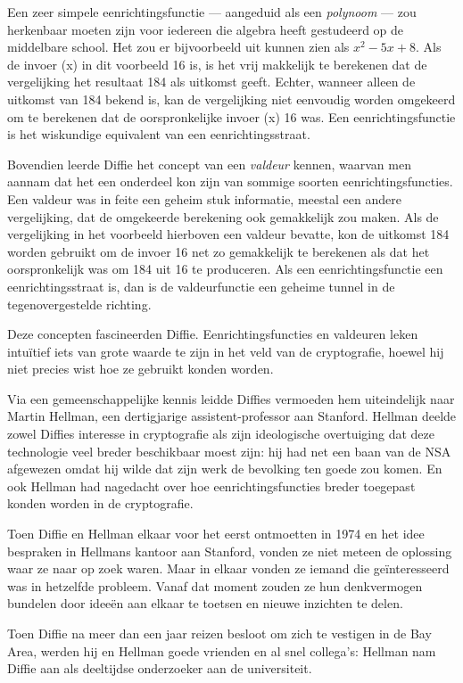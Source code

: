 \documentclass[
  a5paper,
  smalldemyvopaper,11pt,twoside,onecolumn,openright,extrafontsizes,
hidelinks]{memoir}
\begin{document}
Een zeer simpele eenrichtingsfunctie --- aangeduid als een
\emph{polynoom} --- zou herkenbaar moeten zijn voor iedereen die algebra
heeft gestudeerd op de middelbare school. Het zou er bijvoorbeeld uit
kunnen zien als \(x^{2} - 5x + 8\). Als de invoer (x) in dit voorbeeld
16 is, is het vrij makkelijk te berekenen dat de vergelijking het
resultaat 184 als uitkomst geeft. Echter, wanneer alleen de uitkomst van
184 bekend is, kan de vergelijking niet eenvoudig worden omgekeerd om te
berekenen dat de oorspronkelijke invoer (x) 16 was. Een
eenrichtingsfunctie is het wiskundige equivalent van een
eenrichtingsstraat.

Bovendien leerde Diffie het concept van een \emph{valdeur} kennen,
waarvan men aannam dat het een onderdeel kon zijn van sommige soorten
eenrichtingsfuncties. Een valdeur was in feite een geheim stuk
informatie, meestal een andere vergelijking, dat de omgekeerde
berekening ook gemakkelijk zou maken. Als de vergelijking in het
voorbeeld hierboven een valdeur bevatte, kon de uitkomst 184 worden
gebruikt om de invoer 16 net zo gemakkelijk te berekenen als dat het
oorspronkelijk was om 184 uit 16 te produceren. Als een
eenrichtingsfunctie een eenrichtingsstraat is, dan is de valdeurfunctie
een geheime tunnel in de tegenovergestelde richting.

Deze concepten fascineerden Diffie. Eenrichtingsfuncties en valdeuren
leken intuïtief iets van grote waarde te zijn in het veld van de
cryptografie, hoewel hij niet precies wist hoe ze gebruikt konden
worden.

Via een gemeenschappelijke kennis leidde Diffies vermoeden hem
uiteindelijk naar Martin Hellman, een dertigjarige assistent-professor
aan Stanford. Hellman deelde zowel Diffies interesse in cryptografie als
zijn ideologische overtuiging dat deze technologie veel breder
beschikbaar moest zijn: hij had net een baan van de NSA afgewezen omdat
hij wilde dat zijn werk de bevolking ten goede zou komen. En ook Hellman
had nagedacht over hoe eenrichtingsfuncties breder toegepast konden
worden in de cryptografie.

Toen Diffie en Hellman elkaar voor het eerst ontmoetten in 1974 en het
idee bespraken in Hellmans kantoor aan Stanford, vonden ze niet meteen
de oplossing waar ze naar op zoek waren. Maar in elkaar vonden ze iemand
die geïnteresseerd was in hetzelfde probleem. Vanaf dat moment zouden ze
hun denkvermogen bundelen door ideeën aan elkaar te toetsen en nieuwe
inzichten te delen.

Toen Diffie na meer dan een jaar reizen besloot om zich te vestigen in
de Bay Area, werden hij en Hellman goede vrienden en al snel collega's:
Hellman nam Diffie aan als deeltijdse onderzoeker aan de universiteit.
\end{document}
